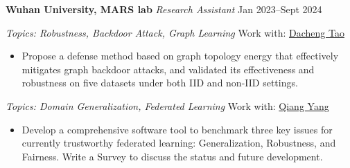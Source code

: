 
\textbf{Wuhan University, MARS lab} \textit{Research Assistant} \hfill Jan 2023--Sept 2024\par  

\textit{Topics: Robustness, Backdoor Attack, Graph Learning} \hfill Work with: \href{https://scholar.google.com/citations?user=RwlJNLcAAAAJ&hl=en&oi=ao}{Dacheng Tao}  \par
\begin{itemize}
        \item Propose a defense method based on graph topology energy that effectively mitigates graph backdoor attacks, and validated its effectiveness and robustness on five datasets under both IID and non-IID settings.
\end{itemize}\par

\textit{Topics: Domain Generalization, Federated Learning} \hfill Work with: \href{https://scholar.google.com.sg/citations?user=1LxWZLQAAAAJ&hl=en}{Qiang Yang}  \par
\begin{itemize}
        \item Develop a comprehensive software tool to benchmark three key issues for currently trustworthy federated learning: Generalization, Robustness, and Fairness. Write a Survey to discuss the status and future development.
\end{itemize}\par

